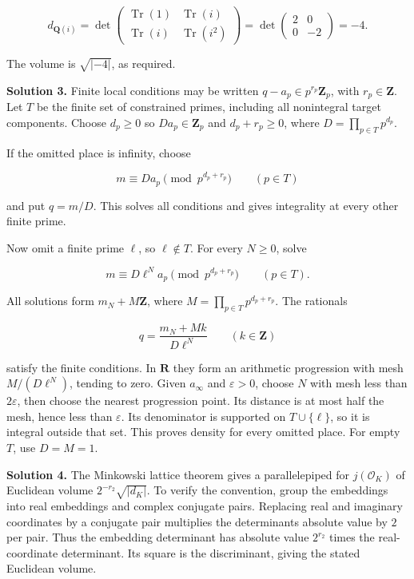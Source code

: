 \documentclass[
  english,
  11pt,
  a4paper,
]{article}
\begin{document}
\[d_{\mathbf Q(i)}=
\det\begin{pmatrix}
\operatorname{Tr}(1)&\operatorname{Tr}(i)\\
\operatorname{Tr}(i)&\operatorname{Tr}(i^2)
\end{pmatrix}
=\det\begin{pmatrix}2&0\\0&-2\end{pmatrix}=-4.\]

The volume is \(\sqrt{|-4|}\), as required.

\textbf{Solution 3.} Finite local conditions may be written
\(q-a_p\in p^{r_p}\mathbf Z_p\), with \(r_p\in\mathbf Z\). Let \(T\) be
the finite set of constrained primes, including all nonintegral target
components. Choose \(d_p\geq0\) so \(D a_p\in\mathbf Z_p\) and
\(d_p+r_p\geq0\), where \(D=\prod_{p\in T}p^{d_p}\).

If the omitted place is infinity, choose

\[m\equiv D a_p\pmod{p^{d_p+r_p}}\qquad(p\in T)\]

and put \(q=m/D\). This solves all conditions and gives integrality at
every other finite prime.

Now omit a finite prime \(\ell\), so \(\ell\notin T\). For every
\(N\geq0\), solve

\[m\equiv D\ell^N a_p\pmod{p^{d_p+r_p}}\qquad(p\in T).\]

All solutions form \(m_N+M\mathbf Z\), where
\(M=\prod_{p\in T}p^{d_p+r_p}\). The rationals

\[q=\frac{m_N+Mk}{D\ell^N}\qquad(k\in\mathbf Z)\]

satisfy the finite conditions. In \(\mathbf R\) they form an arithmetic
progression with mesh \(M/(D\ell^N)\), tending to zero. Given
\(a_\infty\) and \(\varepsilon>0\), choose \(N\) with mesh less than
\(2\varepsilon\), then choose the nearest progression point. Its
distance is at most half the mesh, hence less than \(\varepsilon\). Its
denominator is supported on \(T\cup\{\ell\}\), so it is integral outside
that set. This proves density for every omitted place. For empty \(T\),
use \(D=M=1\).

\textbf{Solution 4.} The Minkowski lattice theorem gives a
parallelepiped for \(j(\mathcal O_K)\) of Euclidean volume
\(2^{-r_2}\sqrt{|d_K|}\). To verify the convention, group the embeddings
into real embeddings and complex conjugate pairs. Replacing real and
imaginary coordinates by a conjugate pair multiplies the
determinant\textquotesingle s absolute value by \(2\) per pair. Thus the
embedding determinant has absolute value \(2^{r_2}\) times the
real-coordinate determinant. Its square is the discriminant, giving the
stated Euclidean volume.
\end{document}
